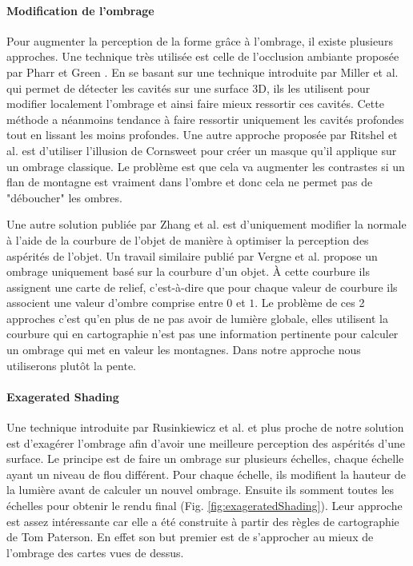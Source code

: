 \paragraph*{Modification de l'ombrage}
Pour augmenter la perception de la forme grâce à l'ombrage, il existe plusieurs approches. Une technique très utilisée est celle de l’occlusion ambiante proposée par Pharr et Green \cite{pharr2004ambient}. En se basant sur une technique introduite par Miller et al. \cite{miller1994efficient} qui permet de détecter les cavités sur une surface 3D, ils les utilisent pour modifier localement l'ombrage et ainsi faire mieux ressortir ces cavités. Cette méthode a néanmoins tendance à faire ressortir uniquement les cavités profondes tout en lissant les moins profondes. Une autre approche proposée par Ritshel et al. \cite{ritschel20083d} est d'utiliser l'illusion de Cornsweet pour créer un masque qu'il applique sur un ombrage classique. Le problème est que cela va augmenter les contrastes si un flan de montagne est vraiment dans l'ombre et donc cela ne permet pas de "déboucher" les ombres. 

Une autre solution publiée par Zhang et al. \cite{zhang2010perceptually} est d'uniquement modifier la normale à l'aide de la courbure de l'objet de manière à optimiser la perception des aspérités de l'objet.
Un travail similaire publié par Vergne et al. \cite{vergne2008apparent} propose un ombrage uniquement basé sur la courbure d'un objet. À cette courbure ils assignent une carte de relief, c'est-à-dire que pour chaque valeur de courbure ils associent une valeur d'ombre comprise entre $0$ et $1$. Le problème de ces 2 approches c'est qu'en plus de ne pas avoir de lumière globale, elles utilisent la courbure qui en cartographie n'est pas une information pertinente pour calculer un ombrage qui met en valeur les montagnes. Dans notre approche nous utiliserons plutôt la pente.

\paragraph*{Exagerated Shading}
Une technique introduite par Rusinkiewicz et al. \cite{rusinkiewicz2006exaggerated} et plus proche de notre solution est d’exagérer l'ombrage afin d'avoir une meilleure perception des aspérités d'une surface. Le principe est de faire un ombrage sur plusieurs échelles, chaque échelle ayant un niveau de flou différent. Pour chaque échelle, ils modifient la hauteur de la lumière avant de calculer un nouvel ombrage. Ensuite ils somment toutes les échelles pour obtenir le rendu final (Fig. \ref{fig:exageratedShading}).  Leur approche est assez intéressante car elle a été construite à partir des règles de cartographie de Tom Paterson. En effet son but premier est de s'approcher au mieux de l'ombrage des cartes vues de dessus.  


